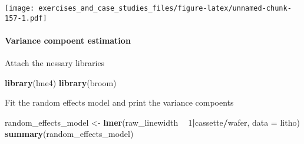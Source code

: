 \documentclass[]{book}
\newenvironment{Shaded}{\begin{snugshade}}{\end{snugshade}}
\newcommand{\DataTypeTok}[1]{\textcolor[rgb]{0.13,0.29,0.53}{#1}}
\newcommand{\DecValTok}[1]{\textcolor[rgb]{0.00,0.00,0.81}{#1}}
\newcommand{\KeywordTok}[1]{\textcolor[rgb]{0.13,0.29,0.53}{\textbf{#1}}}
\newcommand{\NormalTok}[1]{#1}
\newcommand{\OperatorTok}[1]{\textcolor[rgb]{0.81,0.36,0.00}{\textbf{#1}}}
\newcommand{\StringTok}[1]{\textcolor[rgb]{0.31,0.60,0.02}{#1}}
\let\oldparagraph\paragraph
\renewcommand{\paragraph}[1]{\oldparagraph{#1}\mbox{}}
\theoremstyle{definition}
\theoremstyle{definition}
\theoremstyle{definition}
\theoremstyle{remark}
\begin{document}
\begin{Shaded}
\end{Shaded}

\texttt{[image: exercises\_and\_case\_studies\_files/figure-latex/unnamed-chunk-157-1.pdf]}

\hypertarget{variance-compoent-estimation}{%
\paragraph{Variance compoent
estimation}\label{variance-compoent-estimation}}

Attach the nessary libraries

\begin{Shaded}
\begin{Highlighting}[]
\KeywordTok{library}\NormalTok{(lme4)}
\KeywordTok{library}\NormalTok{(broom)}
\end{Highlighting}
\end{Shaded}

Fit the random effects model and print the variance compoents

\begin{Shaded}
\begin{Highlighting}[]
\NormalTok{random_effects_model <-}\StringTok{ }\KeywordTok{lmer}\NormalTok{(raw_linewidth }\OperatorTok{~}\StringTok{ }\DecValTok{1}\OperatorTok{|}\NormalTok{cassette}\OperatorTok{/}\NormalTok{wafer, }\DataTypeTok{data =}\NormalTok{ litho)}
\KeywordTok{summary}\NormalTok{(random_effects_model)}
\end{Highlighting}
\end{Shaded}
\end{document}
